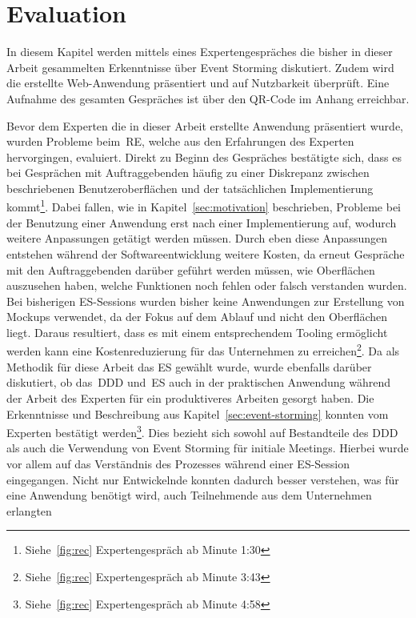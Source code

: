 \chapter{Evaluation}\label{ch:evaluation}
In diesem Kapitel werden mittels eines Expertengespräches die bisher in dieser Arbeit gesammelten Erkenntnisse über Event Storming diskutiert.
Zudem wird die erstellte Web-Anwendung präsentiert und auf Nutzbarkeit überprüft.
Eine Aufnahme des gesamten Gespräches ist über den QR-Code im Anhang erreichbar.

Bevor dem Experten die in dieser Arbeit erstellte Anwendung präsentiert wurde, wurden Probleme beim~\ac{RE}, welche aus den Erfahrungen des Experten
hervorgingen, evaluiert.
Direkt zu Beginn des Gespräches bestätigte sich, dass es bei Gesprächen mit Auftraggebenden häufig zu einer Diskrepanz zwischen beschriebenen Benutzeroberflächen und der
tatsächlichen Implementierung kommt\footnote{Siehe~\ref{fig:rec} Expertengespräch ab Minute 1:30}.
Dabei fallen, wie in Kapitel~\ref{sec:motivation} beschrieben, Probleme bei der Benutzung einer Anwendung erst nach einer Implementierung auf, wodurch
weitere Anpassungen getätigt werden müssen.
Durch eben diese Anpassungen entstehen während der Softwareentwicklung weitere Kosten, da erneut Gespräche mit den Auftraggebenden darüber geführt werden müssen,
wie Oberflächen auszusehen haben, welche Funktionen noch fehlen oder falsch verstanden wurden.
Bei bisherigen \ac{ES}-Sessions wurden bisher keine Anwendungen zur Erstellung von Mockups verwendet, da der Fokus auf dem Ablauf und nicht den Oberflächen liegt.
Daraus resultiert, dass es mit einem entsprechendem Tooling ermöglicht werden kann eine Kostenreduzierung für das Unternehmen zu erreichen\footnote{Siehe~\ref{fig:rec} Expertengespräch ab Minute  3:43}.\newline
Da als Methodik für diese Arbeit das \ac{ES} gewählt wurde, wurde ebenfalls darüber diskutiert, ob das~\ac{DDD} und~\ac{ES} auch in der praktischen
Anwendung während der Arbeit des Experten für ein produktiveres Arbeiten gesorgt haben.
Die Erkenntnisse und Beschreibung aus Kapitel~\ref{sec:event-storming} konnten vom Experten bestätigt werden\footnote{Siehe~\ref{fig:rec} Expertengespräch ab Minute  4:58}.
Dies bezieht sich sowohl auf Bestandteile des \ac{DDD} als auch die Verwendung von Event Storming für initiale Meetings.
Hierbei wurde vor allem auf das Verständnis des Prozesses während einer \ac{ES}-Session eingegangen.
Nicht nur Entwickelnde konnten dadurch besser verstehen, was für eine Anwendung benötigt wird, auch Teilnehmende aus dem Unternehmen erlangten
